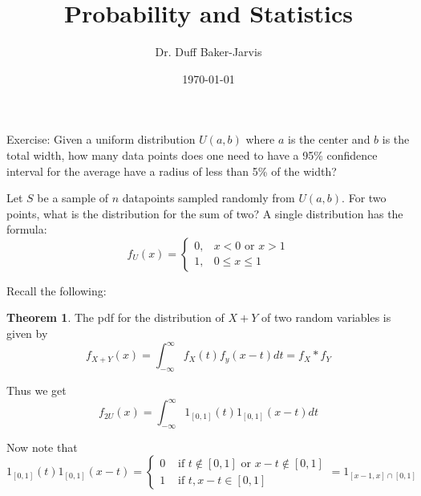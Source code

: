 \documentclass[12pt]{article}
\theoremstyle{definition}
\newtheorem{thm}{Theorem}
\begin{document}
\title{Probability and Statistics}
\date{\today}
\author{Dr. Duff Baker-Jarvis}
\maketitle


Exercise: Given a uniform distribution $ U(a,b) $ where $ a $ is the center and $ b $ is the total width, how many data points does one need to have a 95\% confidence interval for the average have a radius of less than 5\% of the width?

Let $ S $ be a sample of $ n $ datapoints sampled randomly from $ U(a,b) $. For two points, what is the distribution for the sum of two?
A single distribution has the formula:
$$ f_U(x)= \begin{cases}
    0, & x<0 \text{ or } x>1\\
1, & 0\leq x \leq 1
\end{cases}$$

Recall the following:

\begin{thm}
The pdf for the distribution of $ X+Y $ of two random variables is given by
$$ f_{X+Y}(x)=\int_{-\infty}^{\infty} f_X(t)f_y(x-t)  dt=f_X * f_Y $$ 
\end{thm}

Thus we get
$$f_{2U}(x)= \int_{-\infty}^{\infty} 1_{[0,1]}(t)1_{[0,1]}(x-t)  dt  $$ 

Now note that $$ 1_{[0,1]}(t)1_{[0,1]}(x-t) = \begin{cases}
    0	&	\text{ if } t\not \in [0,1] \text{ or } x-t\not \in [0,1]\\
    1	&	\text{ if } t, x-t \in [0,1]
\end{cases} = 1_{[x-1,x]\cap[0,1]}
 $$ 
\end{document}
